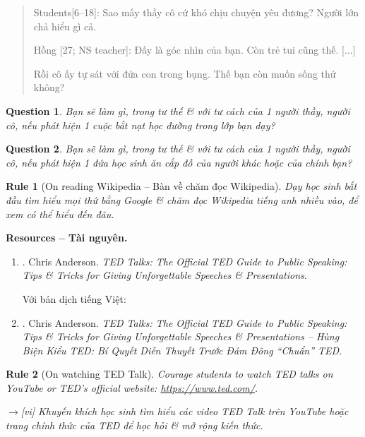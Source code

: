 \documentclass[12pt,oneside]{book}
\newtheorem{question}{Question}
\newtheorem{Rule}{Rule}
\begin{document}
\begin{quote}
	{\sf Students[6--18]}: Sao mấy thầy cô cứ khó chịu chuyện yêu đương? Người lớn chả hiểu gì cả.
	
	{\sf Hồng [27; NS teacher]}: Đấy là góc nhìn của bạn. Còn trẻ tui cũng thế. [...]
	
	Rồi cô ấy tự sát với đứa con trong bụng. Thế bạn còn muốn sống thử không?
\end{quote}

\begin{question}
	Bạn sẽ làm gì, trong tư thế \& với tư cách của 1 người thầy, người cô, nếu phát hiện 1 cuộc bắt nạt học đường trong lớp bạn dạy?
\end{question}

\begin{question}
	Bạn sẽ làm gì, trong tư thế \& với tư cách của 1 người thầy, người cô, nếu phát hiện 1 đứa học sinh ăn cắp đồ của người khác hoặc của chính bạn?
\end{question}

\begin{Rule}[On reading Wikipedia -- Bàn về chăm đọc Wikipedia]
	Dạy học sinh bắt đầu tìm hiểu mọi thứ bằng Google \& chăm đọc Wikipedia tiếng anh nhiều vào, để xem có thể hiểu đến đâu.
\end{Rule}

{\bf \textsf{Resources -- Tài nguyên.}}
\begin{enumerate}
	\item \cite{Anderson_TED}. {\sc Chris Anderson}. {\it TED Talks: The Official TED Guide to Public Speaking: Tips \& Tricks for Giving Unforgettable Speeches \& Presentations}.
	
	Với bản dịch tiếng Việt:
	\item \cite{Anderson_TED_VN}. {\sc Chris Anderson}. {\it TED Talks: The Official TED Guide to Public Speaking: Tips \& Tricks for Giving Unforgettable Speeches \& Presentations -- Hùng Biện Kiểu TED: Bí Quyết Diễn Thuyết Trước Đám Đông ``Chuẩn'' TED}.
\end{enumerate}

\begin{Rule}[On watching TED Talk]
	Courage students to watch TED talks on YouTube or TED's official website: \url{https://www.ted.com/}.
	
	{\sf[en]$\to$[vi]} Khuyến khích học sinh tìm hiểu các video TED Talk trên YouTube hoặc trang chính thức của TED để học hỏi \& mở rộng kiến thức.
\end{Rule}
\end{document}
